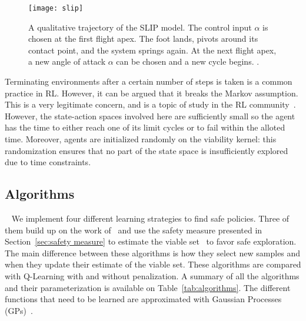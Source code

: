 \begin{figure}
	\centering
	\texttt{[image: slip]}
	\caption{A qualitative trajectory of the SLIP model. The control input $\alpha$ is chosen at the first flight apex. The foot lands, pivots around its contact point, and the system springs again. At the next flight apex, a new angle of attack $\alpha$ can be chosen and a new cycle begins. .}
	\label{fig:slip motion phases}
\end{figure}

\begin{remark}
	Terminating environments after a certain number of steps is taken is a common practice in RL. However, it can be argued that it breaks the Markov assumption. This is a very legitimate concern, and is a topic of study in the RL community~\cite{pardo2018time}. However, the state-action spaces involved here are sufficiently small so the agent has the time to either reach one of its limit cycles or to fail within the alloted time. Moreover, agents are initialized randomly on the viability kernel: this randomization ensures that no part of the state space is insufficiently explored due to time constraints.
\end{remark}

\subsection{Algorithms}~\label{sec:algorithms}
We implement four different learning strategies to find safe policies. Three of them build up on the work of~\textcite{heim2020learnable} and use the safety measure presented in Section~\ref{sec:safety measure} to estimate the viable set \QV~to favor safe exploration. The main difference between these algorithms is how they select new samples and when they update their estimate of the viable set. These algorithms are compared with Q-Learning with and without penalization. A summary of all the algorithms and their parameterization is available on Table~\ref{tab:algorithms}. The different functions that need to be learned are approximated with Gaussian Processes (GPs)~\cite{williams2006gaussian}.

